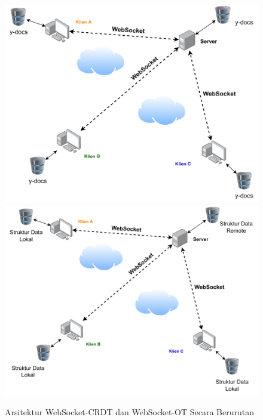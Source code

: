 \begin{figure}
    \centering
    \includegraphics[scale=0.42]{assets/skripsi/Arsitektur_WebSocket_CRDT}
    \includegraphics[scale=0.42]{assets/skripsi/Arsitektur_WebSocket_OT}
    \caption{Arsitektur WebSocket-CRDT dan WebSocket-OT Secara Berurutan}
\end{figure}

